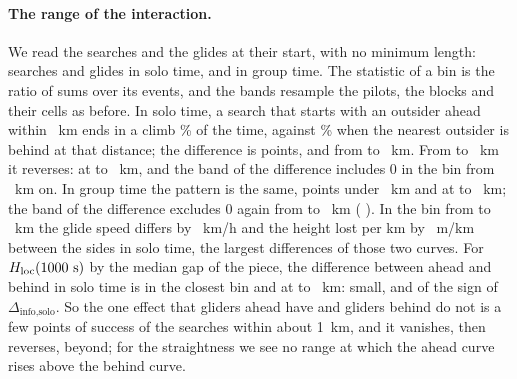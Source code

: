 \paragraph{The range of the interaction.} We read the searches and the glides at their start, with no minimum length: \IgEventsSearchSolo{} searches and \IgEventsSpeedSolo{} glides in solo time, \IgEventsSearchGroup{} and \IgEventsSpeedGroup{} in group time. The statistic of a bin is the ratio of sums over its events, and the bands resample the pilots, the blocks and their cells as before. In solo time, a search that starts with an outsider ahead within \IgBinLow~km ends in a climb \IgSearchSoloAA\% of the time, against \IgSearchSoloBA\% when the nearest outsider is behind at that distance; the difference is \IgSearchSoloDiffA{} \IgSearchSoloDiffABand{} points, and \IgSearchSoloDiffB{} \IgSearchSoloDiffBBand{} from \IgBinLow{} to \IgBinLowTwo~km. From \IgBinLowTwo{} to \IgEdgeFive~km it reverses: \IgSearchSoloDiffC{} \IgSearchSoloDiffCBand{} at \IgBinLowTwo{} to \IgEdgeThree~km, and the band of the difference includes 0 in the bin from \IgMeetSearchSolo~km on. In group time the pattern is the same, \IgSearchGroupDiffA{} \IgSearchGroupDiffABand{} points under \IgBinLow~km and \IgSearchGroupDiffD{} \IgSearchGroupDiffDBand{} at \IgEdgeThree{} to \IgEdgeFour~km; the band of the difference excludes 0 again from \IgEdgeFive{} to \IgEdgeSix~km (\IgSearchGroupDiffF{} \IgSearchGroupDiffFBand). In the bin from \IgBinLow{} to \IgBinLowTwo~km the glide speed differs by \IgSpeedSoloDiffB~km/h and the height lost per km by \IgSinkSoloDiffB~m/km between the sides in solo time, the largest differences of those two curves. For $H_\mathrm{loc}(1000~\mathrm{s})$ by the median gap of the piece, the difference between ahead and behind in solo time is \IgHlocSoloDiffA{} \IgHlocSoloDiffABand{} in the closest bin and \IgHlocSoloDiffC{} \IgHlocSoloDiffCBand{} at \IgHEdgeTwo{} to \IgHEdgeThree~km: small, and of the sign of $\Delta_\text{info,solo}$.
So the one effect that gliders ahead have and gliders behind do not is a few points of success of the searches within about 1~km, and it vanishes, then reverses, beyond; for the straightness we see no range at which the ahead curve rises above the behind curve.

